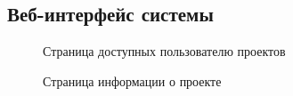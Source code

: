 \documentclass[a4paper,14pt]{extreport} %
\begin{document}
\begin{appendices}

\chapter{Веб-интерфейс системы}
\begin{figure}[H]
\caption{Страница доступных пользователю проектов}
\label{projects-page}
\end{figure}
\begin{figure}[H]
\caption{Страница информации о проекте}
\label{project-page}
\end{figure}
\begin{figure}[H]

\end{figure}
\end{appendices}
\end{document}
